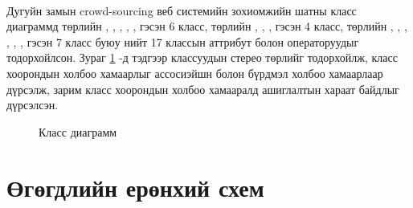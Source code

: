 \paragraph{} Дугуйн замын crowd-sourcing веб системийн зохиомжийн шатны класс диаграммд  төрлийн , , , , ,  гэсэн 6 класс,  төрлийн , , ,  гэсэн 4 класс,  төрлийн , , , , , ,  гэсэн 7 класс буюу нийт 17 классын аттрибут болон операторуудыг тодорхойлсон. Зураг \ref{fig:z-class} -д тэдгээр классуудын стерео төрлийг тодорхойлж, класс хоорондын холбоо хамаарлыг ассосиэйшн болон бүрдмэл холбоо хамаарлаар дүрсэлж, зарим класс хоорондын холбоо хамааралд ашиглалтын хараат байдлыг дүрсэлсэн.
\begin{figure}[!h]
    \centering
    \caption{Класс диаграмм}
    \label{fig:z-class}
\end{figure}

\section{Өгөгдлийн ерөнхий схем }
